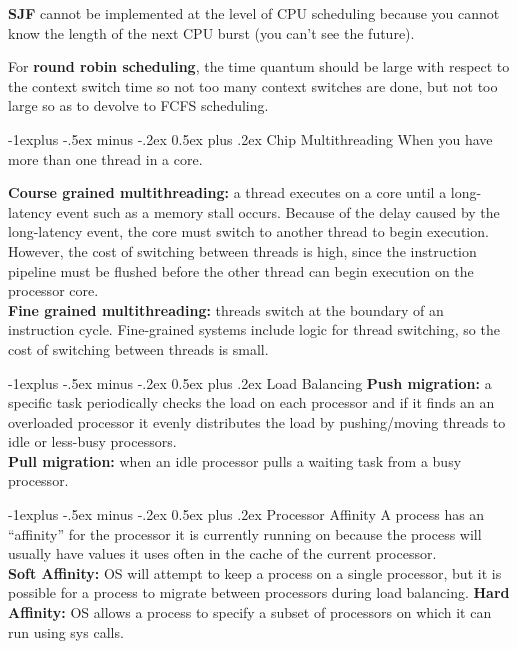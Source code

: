 \documentclass[letterpaper, 12pt]{extarticle}
\makeatletter
\renewcommand{\subsection}{\@startsection{subsection}{2}{0mm}%
                                {-1explus -.5ex minus -.2ex}%
                                {0.5ex plus .2ex}%
                                {\normalfont\small\bfseries}}
\makeatother
\begin{document}
\begin{multicols*}{6}
    \textbf{SJF} cannot be implemented at the level of CPU scheduling because 
    you cannot know the length of the next CPU burst (you can't see the future).

    For \textbf{round robin scheduling}, the time quantum should be large 
    with respect to the context switch time so not too many context switches 
    are done, but not too large so as to devolve to FCFS scheduling. 

    \subsection{Chip Multithreading}
    When you have more than one thread in a core.

    \textbf{Course grained multithreading:} a thread executes on a core until a 
    long-latency event such as a memory stall occurs. Because of the delay 
    caused by the long-latency event, the core must switch to another thread to
    begin execution. However, the cost of switching between threads is high,
    since the instruction pipeline must be flushed before the other thread can
    begin execution on the processor core. \\
    \textbf{Fine grained multithreading:} threads switch at the boundary of 
    an instruction cycle. Fine-grained systems include logic
    for thread switching, so the cost of switching between threads is small.

    \subsection{Load Balancing}
        \textbf{Push migration:} a specific task periodically checks the
        load on each processor and if it finds an an overloaded processor it 
        evenly distributes the load by pushing/moving threads to idle or less-busy
        processors.\\
        \textbf{Pull migration:} when an idle processor pulls a waiting task
        from a busy processor. 
    
    \subsection{Processor Affinity}
        A process has an ``affinity'' for the processor it is currently 
        running on because the process will usually have values it uses often 
        in the cache of the current processor.\\
        \textbf{Soft Affinity:} OS will attempt to keep a process on a single 
        processor, but it is possible for a process to migrate 
        between processors during load balancing.
        \textbf{Hard Affinity:} OS allows a process to specify a subset of 
        processors on which it can run using sys calls.


\end{multicols*}
\end{document}
